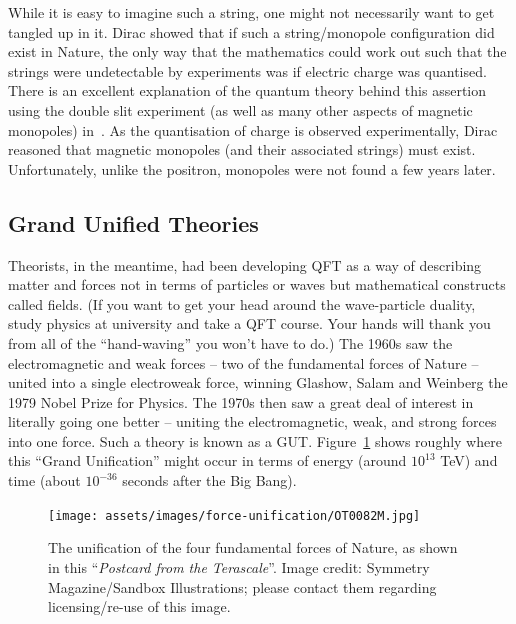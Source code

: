 While it is easy to imagine such a string,
one might not necessarily want to get tangled up in it.
Dirac showed that if such a string/monopole configuration did exist in
Nature, the only way that the mathematics could work out such that the
strings were undetectable by experiments was if electric charge was quantised.
There is an excellent explanation of the quantum theory behind this assertion
using the double slit experiment (as well as many other aspects of magnetic
monopoles) in~\cite{Rajantie2012}.
%
As the quantisation of charge is observed experimentally,
Dirac reasoned that magnetic monopoles (and their associated strings)
must exist.
%
Unfortunately, unlike the positron, monopoles were not found a few years
later.

\subsection{Grand Unified Theories}
\label{sec:guts}
Theorists, in the meantime, had been developing \ac{QFT}
as a way of describing matter and forces not in terms of particles or waves 
but mathematical constructs called fields.
%
(If you want to get your head around the wave-particle duality,
study physics at university and take a \ac{QFT} course.
Your hands will thank you from all of the ``hand-waving'' you won’t have to do.)
%
The 1960s saw the electromagnetic and weak forces -- two of the fundamental
forces of Nature -- united into a single electroweak force,
winning Glashow, Salam and Weinberg the 1979 Nobel Prize for
Physics.
The 1970s then saw a great deal of interest in literally going one
better -- uniting the electromagnetic, weak, and strong forces into one force.
Such a theory is known as a \ac{GUT}. %
Figure~\ref{fig:forceunification} shows roughly where this ``Grand Unification''
might occur in terms of energy (around $10^{13}$ \ac{TeV}) and time
(about $10^{-36}$ seconds after the Big Bang).

%
\begin{figure}[htbp]
  \centering
  \texttt{[image: assets/images/force-unification/OT0082M.jpg]}
  \caption[The unification of the four fundamental forces of Nature]
  {\label{fig:forceunification}%
The unification of the four fundamental forces of Nature,
as shown in this ``\emph{Postcard from the Terascale}''.
Image credit: Symmetry Magazine/Sandbox Illustrations; please contact them
regarding licensing/re-use of this image.}
\end{figure}
%

